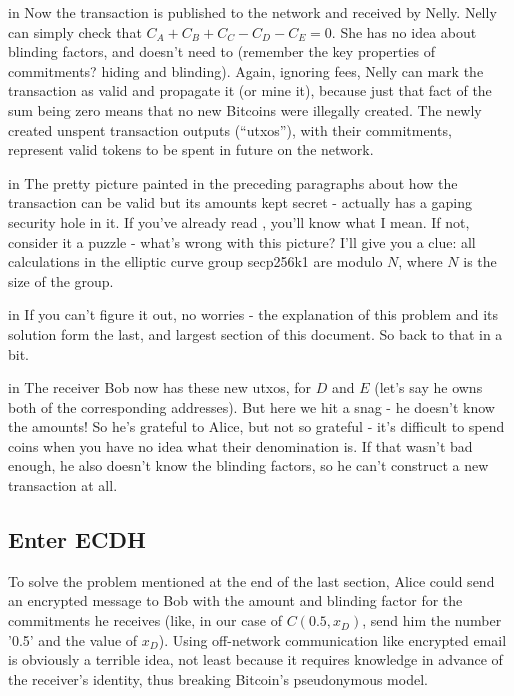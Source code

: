 \documentclass[10pt,a4paper]{article}
\begin{document}
 in \noindent Now the transaction is published to the network and received by Nelly. Nelly can simply check that $C_A + C_B + C_C - C_D - C_E = 0$. She has no idea about blinding factors, and doesn't need to (remember the key properties of commitments? hiding and blinding). Again, ignoring fees, Nelly can mark the transaction as valid and propagate it (or mine it), because just that fact of the sum being zero means that no new Bitcoins were illegally created. The newly created unspent transaction outputs (``utxos''), with their commitments, represent valid tokens to be spent in future on the network.

 in \noindent The pretty picture painted in the preceding paragraphs about how the transaction can be valid but its amounts kept secret - actually has a gaping security hole in it. If you've already read \cite{ct_wu}, you'll know what I mean. If not, consider it a puzzle - what's wrong with this picture? I'll give you a clue: all calculations in the elliptic curve group secp256k1 are modulo $N$, where $N$ is the size of the group.

 in \noindent If you can't figure it out, no worries - the explanation of this problem and its solution form the last, and largest section of this document. So back to that in a bit.

 in \noindent The receiver Bob now has these new utxos, for $D$ and $E$ (let's say he owns both of the corresponding addresses). But here we hit a snag - he doesn't know the amounts! So he's grateful to Alice, but not so grateful - it's difficult to spend coins when you have no idea what their denomination is. If that wasn't bad enough, he also doesn't know the blinding factors, so he can't construct a new transaction at all.

\subsection{Enter ECDH}

To solve the problem mentioned at the end of the last section, Alice could send an encrypted message to Bob with the amount and blinding factor for the commitments he receives (like, in our case of $C(0.5,x_D)$, send him the number '0.5' and the value of $x_D$). Using off-network communication like encrypted email is obviously a terrible idea, not least because it requires knowledge in advance of the receiver's identity, thus breaking Bitcoin's pseudonymous model.
\end{document}
